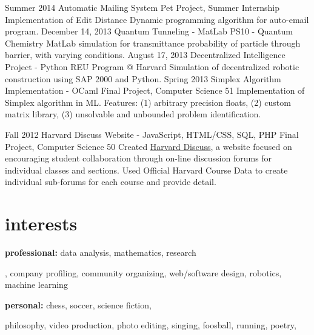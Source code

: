 \documentclass[]{friggeri-cv} %
\begin{document}
\entry
{Summer 2014}
{Automatic Mailing System}
{Pet Project, Summer Internship}
{Implementation of Edit Distance Dynamic programming algorithm for auto-email program.}
\entry
{December 14, 2013}
{Quantum Tunneling - MatLab}
{PS10 - Quantum Chemistry}
{MatLab simulation for transmittance probability of particle through barrier, with varying conditions.}
\entry
{August 17, 2013}
{Decentralized Intelligence Project - Python}
{REU Program @ Harvard}
{Simulation of decentralized robotic construction using SAP 2000 and Python.}
\entry
{Spring 2013}
{Simplex Algorithm Implementation - OCaml}
{Final Project, Computer Science 51}
{Implementation of Simplex algorithm in ML. Features: (1) arbitrary precision floats, (2) custom matrix library, (3) unsolvable and unbounded problem identification.}
\begin{detailed}
\entry
{Fall 2012}
{Harvard Discuss Website - JavaScript, HTML/CSS, SQL, PHP}
{Final Project, Computer Science 50}
{Created \href{https://www.hcs.harvard.edu/~harvarddiscuss/index.php/en/}{Harvard Discuss}, a website focused on encouraging student collaboration through on-line discussion forums for individual classes and sections. Used Official Harvard Course Data to create individual sub-forums for each course and provide detail.}
\end{detailed}


\section{interests}

\textbf{professional:} data analysis, mathematics, research
\begin{detailed}
, company profiling,  community organizing, web/software design, robotics, machine learning \\
\end{detailed}
\textbf{personal:} chess, soccer, science fiction,
\begin{detailed} 
philosophy, video production, photo editing, singing, foosball, running, poetry,
\end{detailed}
\end{document}
